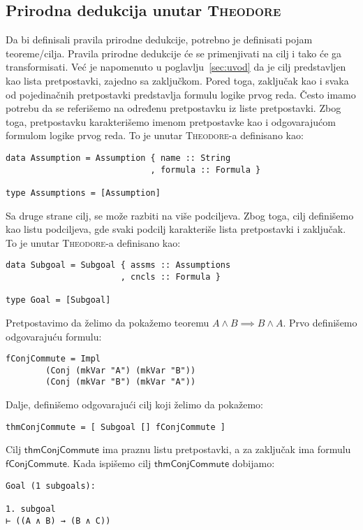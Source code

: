 \documentclass[a4paper,10pt]{article}
\theoremstyle{definition}
\begin{document}
\subsection{Prirodna dedukcija unutar \textsc{Theodore}}
\label{sub:theodore_natded}

Da bi definisali pravila prirodne dedukcije, potrebno je definisati pojam teoreme/cilja. Pravila prirodne dedukcije će se primenjivati na cilj i tako će ga transformisati. Već je napomenuto u poglavlju~\ref{sec:uvod} da je cilj predstavljen kao lista pretpostavki, zajedno sa zaključkom. Pored toga, zaključak kao i svaka od pojedinačnih pretpostavki predstavlja formulu logike prvog reda. Često imamo potrebu da se referišemo na određenu pretpostavku iz liste pretpostavki. Zbog toga, pretpostavku karakterišemo imenom pretpostavke kao i odgovarajućom formulom logike prvog reda. To je unutar \textsc{Theodore}-a definisano kao:
\begin{lstlisting}
data Assumption = Assumption { name :: String
                             , formula :: Formula }

type Assumptions = [Assumption]
\end{lstlisting}

Sa druge strane cilj, se može razbiti na više podciljeva. Zbog toga, cilj definišemo kao listu podciljeva, gde svaki podcilj karakteriše lista pretpostavki i zaključak. To je unutar \textsc{Theodore}-a definisano kao:
\begin{lstlisting}
data Subgoal = Subgoal { assms :: Assumptions
                       , cncls :: Formula }

type Goal = [Subgoal]
\end{lstlisting}

Pretpostavimo da želimo da pokažemo teoremu $A \land B \implies B \land A$. Prvo definišemo odgovarajuću formulu:
\begin{lstlisting}
fConjCommute = Impl
        (Conj (mkVar "A") (mkVar "B"))
        (Conj (mkVar "B") (mkVar "A"))
\end{lstlisting}
Dalje, definišemo odgovarajući cilj koji želimo da pokažemo:
\begin{lstlisting}
thmConjCommute = [ Subgoal [] fConjCommute ]
\end{lstlisting}
Cilj $\mathsf{thmConjCommute}$ ima praznu listu pretpostavki, a za zaključak ima formulu $\mathsf{fConjCommute}$. Kada ispišemo cilj $\mathsf{thmConjCommute}$ dobijamo:
\begin{verbatim}
Goal (1 subgoals):

1. subgoal
⊢ ((A ∧ B) → (B ∧ C))
\end{verbatim}
\end{document}
